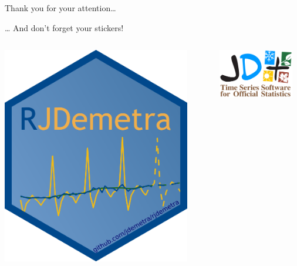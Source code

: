 \documentclass[10pt,xcolor=table,color={dvipsnames,usenames},ignorenonframetext,usepdftitle=false,french]{beamer}
\begin{document}
\begin{frame}{Thank you for your attention\ldots{}}
\protect\hypertarget{thank-you-for-your-attention}{}

\ldots{} And don't forget your stickers!

\bigskip

\begin{columns}
\begin{column}{0.33\textwidth}
\begin{center}
\includegraphics[width=0.9\textwidth]{img/rjdemetra_logo.png}
\end{center}
\end{column}
\begin{column}{0.33\textwidth}
\begin{center}
\includegraphics[width=0.9\textwidth]{img/jdemetra+.png}

\end{center}
\end{column}
\end{columns}
\end{frame}
\end{document}

